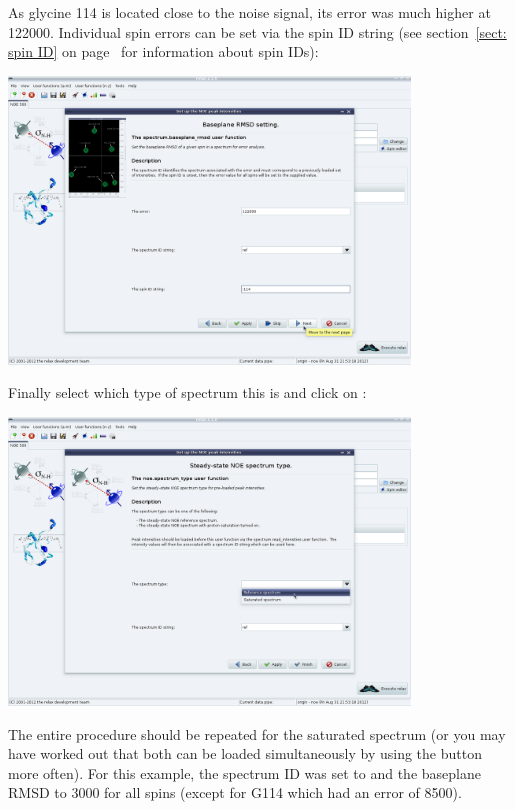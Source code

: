 As glycine 114 is located close to the noise signal, its error was much higher at 122000.
Individual spin errors can be set via the spin ID string (see section~\ref{sect: spin ID} on page~\pageref{sect: spin ID} for information about spin IDs):

\begin{minipage}[h]{\linewidth}
\centerline{\includegraphics[width=0.8\textwidth, bb=14 14 1415 1019]{graphics/screenshots/noe_analysis/peak_intensity6}}
\end{minipage}

Finally select which type of spectrum this is and click on :

\begin{minipage}[h]{\linewidth}
\centerline{\includegraphics[width=0.8\textwidth, bb=14 14 1415 1019]{graphics/screenshots/noe_analysis/peak_intensity7}}
\end{minipage}

The entire procedure should be repeated for the saturated spectrum (or you may have worked out that both can be loaded simultaneously by using the  button more often).
For this example, the spectrum ID was set to  and the baseplane RMSD to 3000 for all spins (except for G114 which had an error of 8500).

